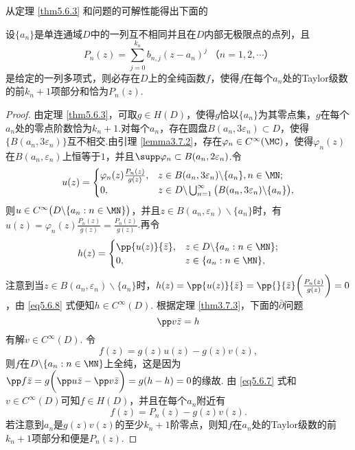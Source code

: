 从定理 \ref{thm5.6.3} 和问题的可解性能得出下面的
\begin{theorem}\label{thm5.6.4}
设$\{a_n\}$是单连通域$D$中的一列互不相同并且在$D$内部无极限点的点列，且
\begin{equation}\label{eq5.6.6}
P_n(z)=\sum_{j=0}^{k_n}b_{n,j}(z-a_n)^j\;\mbox{（$n=1,2,\cdots$）}
\end{equation}
是给定的一列多项式，则必存在$D$上的全纯函数$f$，使得$f$在每个$a_n$处的Taylor级数的前$k_n+1$项部分和恰为$P_n(z)$.
\end{theorem}
\begin{proof}
由定理 \ref{thm5.6.3}，可取$g\in H(D)$，使得$g$恰以$\{a_n\}$为其零点集，$g$在每个$a_n$处的零点阶数恰为$k_n+1$.对每个$a_n$，存在圆盘$B(a_n,3\varepsilon_n)\subset D$，使得$\{B(a_n,3\varepsilon_n)\}$互不相交.由引理 \ref{lemma3.7.2}，存在$\varphi_n\in C^\infty(\MC)$，使得$\varphi_n(z)$在$B(a_n,\varepsilon_n)$上恒等于$1$，并且$\supp\varphi_n\subset B(a_n,2\varepsilon_n)$.令
\begin{equation}\label{eq5.6.7}
u(z)=\begin{cases}
\varphi_n(z)\frac{P_n(z)}{g(z)},&z\in B(a_n,3\varepsilon_n)\backslash\{a_n\},n\in\MN;\\
0,&z\in D\backslash\bigcup_{n=1}^\infty\big(B(a_n,3\varepsilon_n)\backslash
\{a_n\}\big),
\end{cases}
\end{equation}
则$u\in C^\infty\big(D\backslash\{a_n:n\in\MN\}\big)$，并且$z\in B(a_n,\varepsilon_n)\backslash\{a_n\}$时，有$u(z)=\varphi_n(z)\frac{P_n(z)}{g(z)}
=\frac{P_n(z)}{g(z)}$.再令
\begin{equation}\label{eq5.6.8}
h(z)=\begin{cases}
\pp{u(z)}{\bar z},&z\in D\backslash\{a_n:n\in\MN\};\\
0,&z\in\{a_n:n\in\MN\},
\end{cases}
\end{equation}
注意到当$z\in B(a_n,\varepsilon_n)\backslash\{a_n\}$时，$h(z)=\pp{u(z)}{\bar z}
=\pp{}{\bar z}\bigg(\frac{P_n(z)}{g(z)}\bigg)=0$，由 \eqref{eq5.6.8} 式便知$h\in C^\infty(D)$. 根据定理 \ref{thm3.7.3}，下面的$\bar\partial$问题
\[\pp v{\bar z}=h\]
有解$v\in C^\infty(D)$. 令
\[f(z)=g(z)u(z)-g(z)v(z),\]
则$f$在$D\backslash\{a_n:n\in\MN\}$上全纯，这是因为$\pp f{\bar z}=g\bigg(\pp u{\bar z}-\pp v{\bar z}\bigg)=g(h-h)=0$的缘故. 由 \eqref{eq5.6.7} 式和$v\in C^\infty(D)$可知$f\in H(D)$，并且在每个$a_n$附近有
\[f(z)=P_n(z)-g(z)v(z).\]
若注意到$a_n$是$g(z)v(z)$的至少$k_n+1$阶零点，则知$f$在$a_n$处的Taylor级数的前$k_n+1$项部分和便是$P_n(z)$.
\end{proof}

